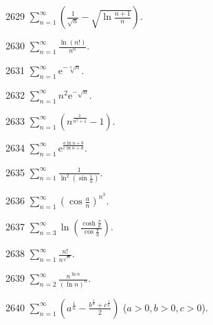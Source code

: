 \begin{prob}[S]{2629}
$\sum_{n=1}^{\infty} \left(\frac{1}{\sqrt{n}} - \sqrt{\ln \frac{n+1}{n}}\right)$.
\end{prob}

\begin{prob}[S]{2630}
$\sum_{n=1}^{\infty} \frac{\ln(n!)}{n^{\alpha}}$.
\end{prob}

\begin{prob}[S]{2631}
$\sum_{n=1}^{\infty} \mathrm{e}^{-\sqrt[3]{n}}$.
\end{prob}

\begin{prob}[S]{2632}
$\sum_{n=1}^{\infty} n^2 \mathrm{e}^{-\sqrt{n}}$.
\end{prob}

\begin{prob}[S]{2633}
$\sum_{n=1}^{\infty} (n^{\frac{1}{n^2+1}} - 1)$.
\end{prob}

\begin{prob}[S]{2634}
$\sum_{n=1}^{\infty} \mathrm{e}^{\frac{a\ln n + b}{c\ln n + d}}$.
\end{prob}

\begin{prob}[S]{2635}
$\sum_{n=1}^{\infty} \frac{1}{\ln^2 \left(\sin \frac{1}{n}\right)}$.
\end{prob}

\begin{prob}[S]{2636}
$\sum_{n=1}^{\infty} \left(\cos \frac{a}{n}\right)^{n^3}$.
\end{prob}

\begin{prob}[S]{2637}
$\sum_{n=3}^{\infty} \ln \left(\frac{\cosh \frac{\pi}{n}}{\cos \frac{\pi}{n}}\right)$.
\end{prob}

\begin{prob}[S]{2638}
$\sum_{n=1}^{\infty} \frac{n!}{n^{\sqrt{n}}}$.
\end{prob}

\begin{prob}[S]{2639}
$\sum_{n=2}^{\infty} \frac{n^{\ln n}}{(\ln n)^n}$.
\end{prob}

\begin{prob}[S]{2640}
$\sum_{n=1}^{\infty} \left(a^{\frac{1}{n}} - \frac{b^{\frac{1}{n}} + c^{\frac{1}{n}}}{2}\right)$ ($a > 0, b > 0, c > 0$).
\end{prob}

